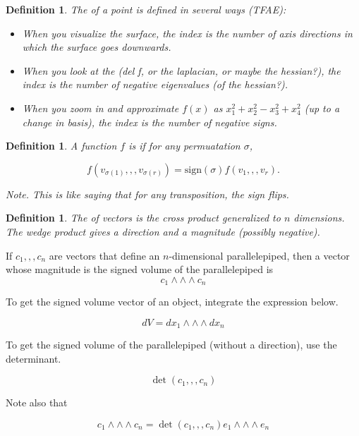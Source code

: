\documentclass[11pt]{amsbook}
\newenvironment{dateenv}{
	\vspace{1em}
}{
	\vspace{1em}
}
\newcommand{\mydate}[4]{
	\newdate{#1}{#2}{#3}{#4}
	\begin{dateenv}
		\hfill\displaydate{#1}
	\end{dateenv}
}
\theoremstyle{mystyle} \newtheorem{thrm}[thm]{Theorem}
\theoremstyle{mystyle} \newtheorem{defi}[thm]{Definition}
\theoremstyle{mystyle} \newtheorem{coro}[thm]{Corollary}
\theoremstyle{mystyle} \newtheorem{propo}[thm]{Proposition}
\theoremstyle{mystyle} \newtheorem{lemm}[thm]{Lemma}
\numberwithin{thm}{section}
\newcommand{\sign}{\text{sign}}
\begin{document}
\begin{defi}
	The  of a point is defined in several ways (TFAE):
	\begin{itemize}
		\item When you visualize the surface, the index is the number of axis directions in which the surface goes downwards.
		\item When you look at the (del f, or the laplacian, or maybe the hessian?), the index is the number of negative eigenvalues (of the hessian?).
		\item When you zoom in and approximate $f(x)$ as $x_1^2 + x_2^2 - x_3^2 + x_4^2$ (up to a change in basis), the index is the number of negative signs.
	\end{itemize}
\end{defi}

\mydate{d20}{5}{12}{2016}

\begin{defi}
	A function $f$ is  if for any permuatation $\sigma$,

	$$f(v_{\sigma(1)},,,v_{\sigma(r)}) = \sign(\sigma)f(v_1,,,v_r).$$

	Note.  This is like saying that for any transposition, the sign flips.
\end{defi}

\begin{defi}
	The  of vectors is the cross product generalized to $n$ dimensions.  The wedge product gives a direction and a magnitude (possibly negative).
\end{defi}
\begin{example}
	If $c_1,,,c_n$ are vectors that define an $n$-dimensional parallelepiped, then a vector whose magnitude is the signed volume of the parallelepiped is $$c_1 \wedge\wedge\wedge c_n$$
\end{example}
\begin{example}
	To get the signed volume vector of an object, integrate the expression below.

	$$ dV = dx_1 \wedge\wedge\wedge dx_n$$
\end{example}
\begin{example}
	To get the signed volume of the parallelepiped (without a direction), use the determinant.

	$$\det(c_1,,,c_n)$$

	Note also that

	$$c_1 \wedge\wedge\wedge c_n = \det(c_1,,,c_n) e_1 \wedge\wedge\wedge e_n$$
\end{example}
\end{document}
